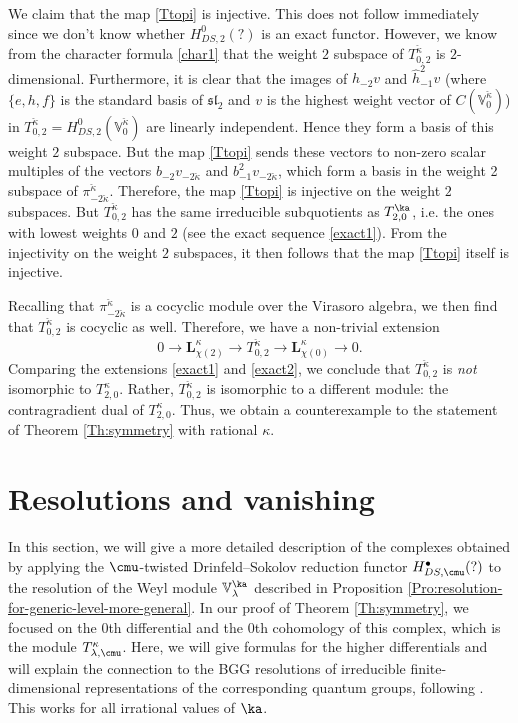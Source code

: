 \documentclass{amsart}
\newcommand{\V}{\mathbb{V}}
\newcommand{\+}{\mathop{\oplus}}
\renewcommand{\*}{{\otimes}}
\newcommand{\mf}{\mathfrak}
\newcommand{\ra}{\rightarrow}
\newcommand{\lam}{\lambda}
\theoremstyle{theorem}
\theoremstyle{remark}
\numberwithin{equation}{section}
\begin{document}
We claim that the map \eqref{Ttopi} is injective. This does not follow
immediately since we don't know whether $H_{DS,2}^0(?)$ is an exact
functor. However, we know from the character formula \eqref{char1}
that the weight $2$ subspace of $T^{\check{\kappa}}_{0,2}$ is
$2$-dimensional. Furthermore, it is clear that the images of
$\hat{h}_{-2}v$ and $\hat{h}_{-1}^2v$ (where $\{e,h,f\}$ is the
standard basis of $\mf{sl}_2$ and $v$ is the highest weight vector of
$C(\mathbb{V}^{\check{\kappa}}_0)$) in
$T^{\check{\kappa}}_{0,2}=H_{DS,2}^0(\mathbb{V}^{\check{\kappa}}_0)$
are linearly independent. Hence they form a basis of this weight $2$
subspace. But the map \eqref{Ttopi} sends these vectors to non-zero
scalar multiples of the vectors $b_{-2}v_{-2\check{\kappa}}$ and
$b_{-1}^2v_{-2\check{\kappa}}$, which form a basis in the weight 2
subspace of $\pi^{\check{\kappa}}_{-2\check{\kappa}}$. Therefore, the
map \eqref{Ttopi} is injective on the weight $2$ subspaces. But
$T^{\check{\kappa}}_{0,2}$ has the same irreducible subquotients as
$T^\ka_{2,0}$, i.e. the ones with lowest weights $0$ and $2$ (see the
exact sequence \eqref{exact1}). From the injectivity on the weight $2$
subspaces, it then follows that the map \eqref{Ttopi} itself is
injective.

Recalling that $\pi^{\check{\kappa}}_{-2\check{\kappa}}$ is a cocyclic
module over the Virasoro algebra, we then find that
$T^{\check{\kappa}}_{0,2}$ is cocyclic as well. Therefore, we have a
non-trivial extension
\begin{equation}    \label{exact2}
0\ra \mathbf{L}_{\chi(2)}^\kappa \ra T^{\check{\kappa}}_{0,2} \ra 
\mathbf{L}_{\chi(0)}^\kappa\ra 0.
\end{equation}
Comparing the extensions \eqref{exact1} and \eqref{exact2}, we
conclude that $T^{\check{\kappa}}_{0,2}$ is {\em not} isomorphic to
$T^\kappa_{2,0}$. Rather, $T^{\check{\kappa}}_{0,2}$ is isomorphic to
a different module: the contragradient dual of $T^\kappa_{2,0}$. Thus,
we obtain a counterexample to the statement of Theorem
\ref{Th:symmetry} with rational $\kappa$.

\section{Resolutions and vanishing}    \label{higher}

In this section, we will give a more detailed description of the
complexes obtained by applying the $\cmu$-twisted Drinfeld--Sokolov
reduction functor $H^\bullet_{DS,\cmu}(?)$ to the resolution of the
Weyl module $\V^\ka_\lam$ described in Proposition
\ref{Pro:resolution-for-generic-level-more-general}. In our proof of
Theorem \ref{Th:symmetry}, we focused on the $0$th differential and
the $0$th cohomology of this complex, which is the module
$T^\kappa_{\lam,\cmu}$. Here, we will give formulas for the higher
differentials and will explain the connection to the BGG resolutions
of irreducible finite-dimensional representations of the corresponding
quantum groups, following \cite{FF93,FF:wak}. This works for all
irrational values of $\ka$.
\end{document}
